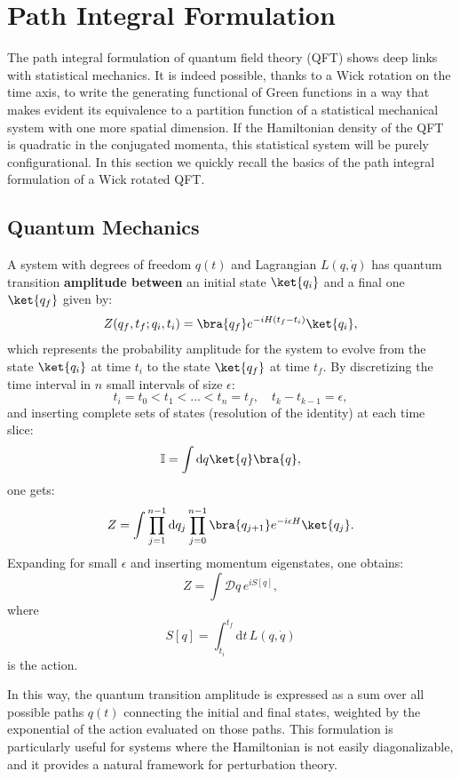 \section{Path Integral Formulation}

The path integral formulation of quantum field theory (QFT) shows deep links with statistical mechanics.
It is indeed possible, thanks to a Wick rotation on the time axis, to write the generating functional of Green functions in a way that makes evident its equivalence to a partition function of a statistical mechanical system with one more spatial dimension.
If the Hamiltonian density of the QFT is quadratic in the conjugated momenta, this statistical system will be purely configurational.
In this section we quickly recall the basics of the path integral formulation of a Wick rotated QFT.

\subsection{Quantum Mechanics}

A system with degrees of freedom \(q(t)\) and Lagrangian \(L(q,\dot{q})\) has quantum transition \textbf{amplitude between} an initial state \(\ket{q_{i}}\) and a final one \(\ket{q_{f}}\) given by:
\[
    Z(q_{f},t_{f};q_{i},t_{i})=\bra{q_{f}}e^{-iH(t_{f}-t_{i})}\ket{q_{i}},
\]
which represents the probability amplitude for the system to evolve from the state \(\ket{q_{i}}\) at time \(t_{i}\) to the state \(\ket{q_{f}}\) at time \(t_{f}\). By discretizing the time interval in \(n\) small intervals of size \(\epsilon\):
\[
    t_{i}=t_{0}<t_{1}<...<t_{n}=t_{f}, \quad t_{k}-t_{k-1}=\epsilon,
\]
and inserting complete sets of states (resolution of the identity) at each time slice:
\[
    \mathbb{I}=\int \mathrm{d} q\ket{q}\bra{q},
\]
one gets:
\[
    Z=\int\prod_{j=1}^{n-1}\mathrm{d} q_{j}\prod_{j=0}^{n-1}\bra{q_{j+1}}e^{-i\epsilon H}\ket{q_{j}}.
\]
Expanding for small \(\epsilon\) and inserting momentum eigenstates, one obtains:
\begin{equation}
    Z=\int\mathcal{D}q \, e^{iS[q]},
    \label{eq:path_integral_qm}
\end{equation}
where
\[
    S[q]=\int_{t_{i}}^{t_{f}}\mathrm{d}t \, L(q,\dot{q})
\]
is the action.

In this way, the quantum transition amplitude is expressed as a sum over all possible paths \(q(t)\) connecting the initial and final states, weighted by the exponential of the action evaluated on those paths.
This formulation is particularly useful for systems where the Hamiltonian is not easily diagonalizable, and it provides a natural framework for perturbation theory.


